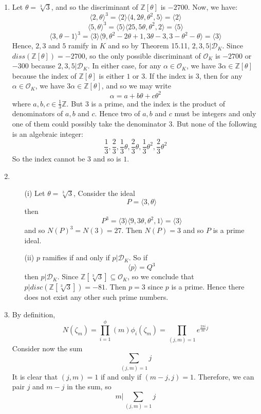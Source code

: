 \begin{enumerate}
\item Let $\theta=\sqrt[3]{3}$, and so the discriminant of $\mathbb{Z}[\theta]$ is $-2700$. Now, we have:
$$\langle 2,\theta \rangle^3= \langle 2 \rangle \langle 4,2\theta,\theta^2,5\rangle=\langle 2 \rangle$$
$$\langle 5,\theta \rangle^3= \langle 5 \rangle \langle 25,5\theta, \theta^2,2\rangle=\langle 5 \rangle$$
$$\langle 3,\theta-1\rangle^3=\langle 3 \rangle \langle 9,\theta^2-2\theta+1,3\theta-3,3-\theta^2-\theta \rangle =\langle 3\rangle$$
Hence, $2,3$ and $5$ ramify in $K$ and so by Theorem 15.11, $2,3,5|\mathcal{D}_K$. Since
$diss(\mathbb{Z}[\theta])=-2700$, so the only possible discriminant of $\mathcal{O}_K$ is $-2700$ or $-300$ because $2,3,5 |\mathcal{D}_K$. In either case, for any $\alpha \in \mathcal{O}_K$, we have
$3\alpha \in \mathbb{Z}[\theta]$ because the index of $\mathbb{Z}[\theta]$ is either $1$ or $3$.
If the index is $3$, then for any $\alpha \in \mathcal{O}_K$, we have $3\alpha \in \mathbb{Z}[\theta]$,
and so we may write
$$\alpha=a+b\theta+c\theta^2$$
where $a,b,c \in \frac{1}{3}\mathbb{Z}$. But $3$ is a prime, and the index is the product of denominators of
$a,b$ and $c$. Hence two of $a,b$ and $c$ must be integers and only one of them could possibly take the denominator $3$. But none of the following is an algebraic integer:
$$\frac{1}{3},\frac{2}{3},\frac{1}{3}\theta,\frac{2}{3}\theta,\frac{1}{3}\theta^2,\frac{2}{3}\theta^2$$
So the index cannot be $3$ and so is $1$.
\item \begin{enumerate}
\item[(i)] Let $\theta=\sqrt[3]{3}$, Consider the ideal
$$P=\langle 3,\theta \rangle$$
then
$$P^3=\langle 3 \rangle \langle 9,3\theta,\theta^2,1 \rangle=\langle 3 \rangle$$
and so $N(P)^3=N(3)=27$. Then $N(P)=3$ and so $P$ is a prime ideal.\\
\item[(ii)] $p$ ramifies if and only if $p|\mathcal{D}_K$. So if
$$\langle p \rangle =Q^3$$
then $p|\mathcal{D}_K$. Since $\mathbb{Z}[\sqrt[3]{3}] \subseteq \mathcal{O}_K$, so we conclude that
$p|disc(\mathbb{Z}[\sqrt[3]{3}])=-81$. Then $p=3$ since $p$ is a prime. Hence there does not exist any other such prime numbers.
\end{enumerate}
\item By definition,
$$N(\zeta_m)=\prod_{i=1}^\phi(m) \phi_i(\zeta_m)=\prod_{(j,m)=1}e^{\frac{2\pi i}{m}j}$$
Consider now the sum
$$\sum_{(j,m)=1}j$$
It is clear that $(j,m)=1$ if and only if $(m-j,j)=1$. Therefore, we can pair $j$ and $m-j$ in the sum, so
$$m |\sum_{(j,m)=1}j$$

\end{enumerate}
